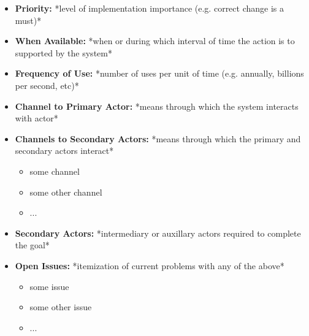 \documentclass[12pt]{article}
\begin{document}
\begin{itemize}
        \item[]\textbf{Priority:}
            *level of implementation importance (e.g. correct change is a must)*

        \item[]\textbf{When Available:}
            *when or during which interval of time the action is to supported by the system*

        \item[]\textbf{Frequency of Use:}
            *number of uses per unit of time (e.g. annually, billions per second, etc)*

        \item[]\textbf{Channel to Primary Actor:}
            *means through which the system interacts with actor*

        \item[]\textbf{Channels to Secondary Actors:}  
        *means through which the primary and secondary actors interact*
            \begin{itemize}
                \item[] some channel
                \item[] some other channel
                \item[] ...
            \end{itemize}
        \item[]\textbf{Secondary Actors:}
            *intermediary or auxillary actors required to complete the goal*

        \item[]\textbf{Open Issues:}
        *itemization of current problems with any of the above*
            \begin{itemize}
                \item[] some issue
                \item[] some other issue
                \item[] ...
            \end{itemize}
    \end{itemize}
    
    
    
    
\end{document}
